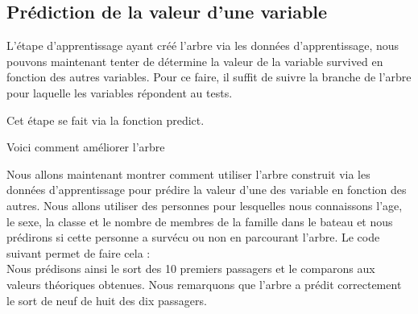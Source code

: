 \documentclass[compress]{beamer}
\begin{document}
\subsection{Prédiction de la valeur d'une variable}
\begin{frame}
L'étape d'apprentissage ayant créé l'arbre via les données d'apprentissage, nous pouvons maintenant tenter de détermine la valeur de la variable \textrm{survived}
en fonction des autres variables. Pour ce faire, il suffit de suivre la branche de l'arbre pour laquelle les variables répondent au tests.\newline

Cet étape se fait via la fonction \textrm{predict}. \newline


\end{frame}

\begin{frame}
 Voici comment améliorer l'arbre
\end{frame}

\begin{frame}
 Nous allons maintenant montrer comment utiliser l'arbre construit via les données d'apprentissage pour prédire la valeur d'une des variable en fonction des autres.
 Nous allons utiliser des personnes pour lesquelles nous connaissons l'age, le sexe, la classe et le nombre de membres de la famille dans le bateau et nous prédirons
 si cette personne a survécu ou non en parcourant l'arbre. Le code suivant permet de faire cela :\\
 
 Nous prédisons ainsi le sort des 10 premiers passagers et le comparons aux valeurs théoriques obtenues. Nous remarquons que l'arbre a prédit correctement le sort
 de neuf de huit des dix passagers.
\end{frame}
\end{document}

